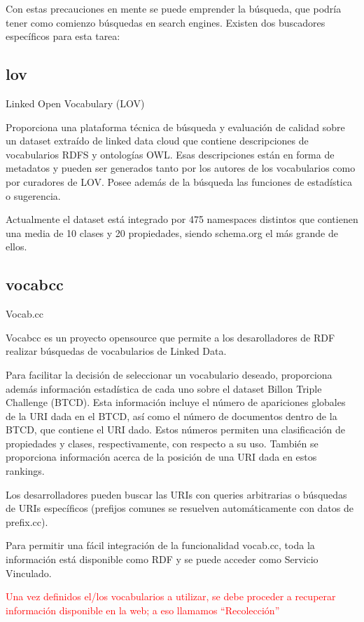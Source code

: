 Con estas precauciones en mente se puede emprender la búsqueda, que podría tener como comienzo búsquedas en  search engines. 
Existen dos buscadores específicos para esta tarea:

\subsection{lov}

Linked Open Vocabulary (LOV)

Proporciona una plataforma técnica de búsqueda y evaluación de calidad sobre un dataset extraído de linked data cloud que contiene descripciones de vocabularios RDFS 
y ontologías OWL. Esas descripciones están en forma de metadatos y pueden ser generados tanto por los autores de los vocabularios como por curadores de LOV.
Posee además de la búsqueda las funciones de estadística o sugerencia.

Actualmente el dataset está integrado por 475 namespaces distintos que contienen una media de 10 clases y 20 propiedades, siendo schema.org el más grande de ellos.

\subsection{vocabcc}

Vocab.cc

Vocabcc es un proyecto opensource que permite a los desarolladores de RDF realizar búsquedas de vocabularios de Linked Data.

Para facilitar la decisión de seleccionar un vocabulario deseado, proporciona además información estadística de cada uno sobre el dataset Billon Triple Challenge (BTCD). 
 Esta información incluye el número de apariciones globales de la URI dada en el BTCD, así como el número de documentos dentro de la BTCD, que contiene el URI dado. Estos números permiten una clasificación de propiedades y clases, respectivamente, con respecto a su uso. También se proporciona información acerca de la posición de una URI dada en estos rankings.

Los desarrolladores pueden buscar las URIs con queries arbitrarias o búsquedas de URIs específicos (prefijos comunes se resuelven automáticamente con datos de prefix.cc).

Para permitir una fácil integración de la funcionalidad vocab.cc, toda la información está disponible como RDF y se puede acceder como Servicio Vinculado.

\begin{framed}
\textcolor{red}{Una vez definidos el/los vocabularios a utilizar, se debe proceder a recuperar información disponible en la web; a eso llamamos ``Recolección''}
\end{framed}


